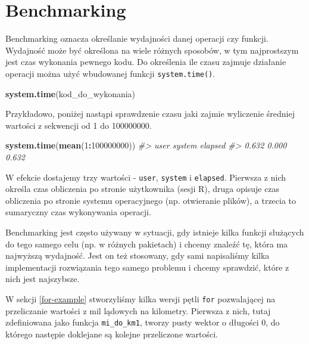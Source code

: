 \documentclass[paper=6in:9in,pagesize=pdftex,headinclude=on,footinclude=on,10pt]{scrbook}
\newenvironment{Shaded}{\begin{snugshade}}{\end{snugshade}}
\newcommand{\CommentTok}[1]{\textcolor[rgb]{0.56,0.35,0.01}{\textit{#1}}}
\newcommand{\DecValTok}[1]{\textcolor[rgb]{0.00,0.00,0.81}{#1}}
\newcommand{\KeywordTok}[1]{\textcolor[rgb]{0.13,0.29,0.53}{\textbf{#1}}}
\newcommand{\NormalTok}[1]{#1}
\newcommand{\OperatorTok}[1]{\textcolor[rgb]{0.81,0.36,0.00}{\textbf{#1}}}
\begin{document}
\hypertarget{benchmarking}{%
\section{Benchmarking}\label{benchmarking}}

Benchmarking oznacza określanie wydajności danej operacji czy funkcji.
Wydajność może być określona na wiele różnych sposobów, w tym najprostszym jest czas wykonania pewnego kodu.
Do określenia ile czasu zajmuje działanie operacji można użyć wbudowanej funkcji \texttt{system.time()}.

\begin{Shaded}
\begin{Highlighting}[]
\KeywordTok{system.time}\NormalTok{(kod_do_wykonania)}
\end{Highlighting}
\end{Shaded}

Przykładowo, poniżej nastąpi sprawdzenie czasu jaki zajmie wyliczenie średniej wartości z sekwencji od 1 do 100000000.

\begin{Shaded}
\begin{Highlighting}[]
\KeywordTok{system.time}\NormalTok{(}\KeywordTok{mean}\NormalTok{(}\DecValTok{1}\OperatorTok{:}\DecValTok{100000000}\NormalTok{))}
\CommentTok{#>    user  system elapsed }
\CommentTok{#>   0.632   0.000   0.632}
\end{Highlighting}
\end{Shaded}

W efekcie dostajemy trzy wartości - \texttt{user}, \texttt{system} i \texttt{elapsed}. Pierwsza z nich określa czas obliczenia po stronie użytkownika (sesji R), druga opisuje czas obliczenia po stronie systemu operacyjnego (np. otwieranie plików), a trzecia to sumaryczny czas wykonywania operacji.

Benchmarking jest często używany w sytuacji, gdy istnieje kilka funkcji służących do tego samego celu (np. w różnych pakietach) i chcemy znaleźć tę, która ma najwyższą wydajność.
Jest on też stosowany, gdy sami napisaliśmy kilka implementacji rozwiązania tego samego problemu i chcemy sprawdzić, które z nich jest najszybsze.

W sekcji \ref{for-example} stworzyliśmy kilka wersji pętli \texttt{for} pozwalającej na przeliczanie wartości z mil lądowych na kilometry.
Pierwsza z nich, tutaj zdefiniowana jako funkcja \texttt{mi\_do\_km1}, tworzy pusty wektor o długości 0, do którego następie doklejane są kolejne przeliczone wartości.
\end{document}
